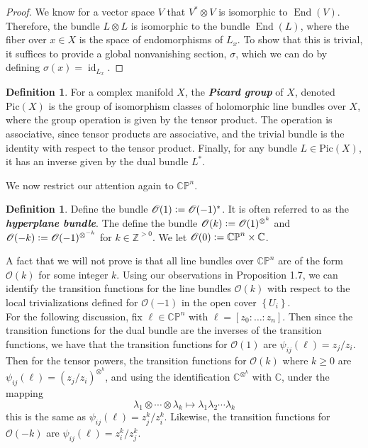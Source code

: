 \documentclass[psamsfonts, 12pt]{amsart}
\theoremstyle{definition}
\newtheorem{defn}[thm]{Definition}
\theoremstyle{remark}
\renewcommand{\O}{\mathscr{O}}
\newcommand{\ib}[1]{\textbf{\textit{#1}}}
\newcommand{\Z}{\mathbb{Z}}
\newcommand{\C}{\mathbb{C}}
\newcommand{\CP}{\mathbb{CP}}
\newcommand{\set}[1]{\left\lbrace #1 \right\rbrace}
\newcommand{\defeq}{\vcentcolon=}
\DeclareMathOperator{\id}{id}
\DeclareMathOperator{\End}{End}
\begin{document}
%
\begin{proof}
We know for a vector space $V$ that $V^*\otimes V$ is isomorphic to $\End(V)$.
Therefore, the bundle $L \otimes L$ is isomorphic to the bundle
$\End(L)$, where the fiber over $x \in X$ is the space of endomorphisms of $L_x$.
To show that this is trivial, it suffices to provide a global nonvanishing section,
$\sigma$, which we can do by defining $\sigma(x) = \id_{L_x}$.
\end{proof}
%
\begin{defn}
For a complex manifold $X$, the \ib{Picard group} of $X$, denoted
$\mathrm{Pic}(X)$ is the group of isomorphism classes of holomorphic line bundles over
$X$, where the group operation is given by the tensor product. The operation is
associative, since tensor products are associative, and the trivial bundle is the
identity with respect to the tensor product. Finally, for any bundle
$L \in \mathrm{Pic}(X)$, it has an inverse given by the dual bundle $L^*$.
\end{defn}
%
We now restrict our attention again to $\CP^n$.
%
\begin{defn}
Define the bundle $\O(1) \defeq \O(-1)^*$. It is often referred to as the
\ib{hyperplane bundle}. The define the bundle $\O(k) \defeq \O(1)^{\otimes^k}$
and $\O(-k) \defeq \O(-1)^{\otimes^{-k}}$ for $k \in \Z^{>0}$. We let
$\O(0)\defeq \CP^n \times \C$.
\end{defn}
%
A fact that we will not prove is that all line bundles over $\CP^n$ are of
the form $\O(k)$ for some integer $k$. Using our observations in Proposition 1.7,
we can identify the transition functions for the line bundles $\O(k)$ with
respect to the local trivializations defined for $\O(-1)$ in the open cover
$\set{U_i}$. \\

For the following discussion, fix $\ell \in \CP^n$ with $\ell = [z_0: \ldots : z_n]$.
Then since the transition functions for the dual bundle are the inverses of the
transition functions, we have that the transition functions for $\O(1)$ are
$\psi_{ij}(\ell) = z_j/z_i$. Then for the tensor powers, the transition functions
for $\O(k)$ where $k \geq 0$ are $\psi_{ij}(\ell) = (z_j/z_i)^{\otimes^k}$, and
using the identification $\C^{\otimes^k}$ with $\C$, under the mapping
\[
\lambda_1 \otimes \cdots \otimes \lambda_k \mapsto \lambda_1\lambda_2\cdots\lambda_k
\]
this is the same as
$\psi_{ij}(\ell) = z_j^k/z_i^k$. Likewise, the transition functions for $\O(-k)$
are $\psi_{ij}(\ell) = z_i^k/z_j^k$. \\
\end{document}
